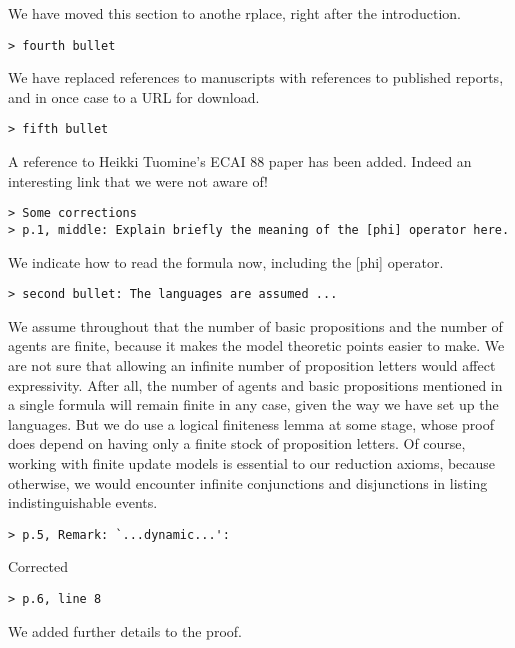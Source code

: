 \documentclass{article}
\begin{document}
We have moved this section to anothe rplace, right after the introduction.

\begin{verbatim}
> fourth bullet
\end{verbatim}

We have replaced references to manuscripts with references
to published reports, and in once case to a URL for download.

\begin{verbatim}
> fifth bullet
\end{verbatim}

A reference to Heikki Tuomine's ECAI 88 paper has been added.
Indeed an interesting link that we were not aware of!

\begin{verbatim}
> Some corrections
> p.1, middle: Explain briefly the meaning of the [phi] operator here.
\end{verbatim}

We indicate how to read the formula now, including the [phi] operator.

\begin{verbatim}
> second bullet: The languages are assumed ...
\end{verbatim}

We assume throughout that the number of basic propositions and the
number of agents are finite, because it makes the model theoretic
points easier to make. We are not sure that allowing an infinite
number of proposition letters would affect expressivity. After all,
the number of agents and basic propositions mentioned in a single
formula will remain finite in any case, given the way we have set up
the languages. But we do use a logical finiteness lemma at some stage,
whose proof does depend on having only a finite stock of proposition
letters. Of course, working with finite update models is essential
to our reduction axioms, because otherwise, we would encounter  infinite
conjunctions and disjunctions in listing indistinguishable events.


\begin{verbatim}
> p.5, Remark: `...dynamic...':
\end{verbatim}

Corrected

\begin{verbatim}
> p.6, line 8
\end{verbatim}

We added further details to the proof.
\end{document}
